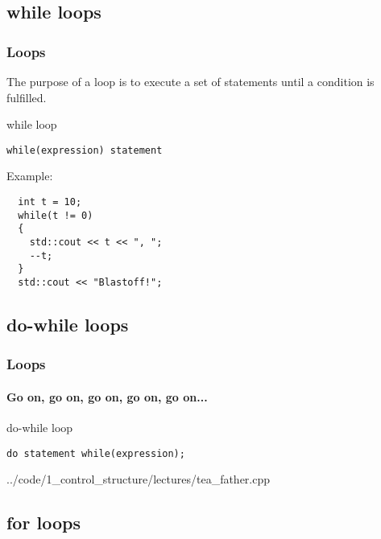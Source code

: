 \documentclass{beamer}
\begin{document}
\subsection{while loops}

\begin{frame}[fragile]
  \frametitle{Loops}
  The purpose of a loop is to execute a set of statements until a condition is fulfilled.
  \pause
  \begin{block}{while loop}
    \begin{lstlisting}
while(expression) statement
    \end{lstlisting}
    Example:
  \begin{lstlisting}
  int t = 10;
  while(t != 0)
  {
    std::cout << t << ", ";
    --t;  
  }
  std::cout << "Blastoff!";
  \end{lstlisting}
  \end{block}
\end{frame}

\subsection{do-while loops}

\begin{frame}[fragile]
  \frametitle{Loops}
  \framesubtitle{Go on, go on, go on, go on, go on...}
  
  \begin{block}{do-while loop}
    \begin{lstlisting}
do statement while(expression);
    \end{lstlisting}
    {../code/1_control_structure/lectures/tea_father.cpp}
  \end{block}
\end{frame}

\subsection{for loops}
\end{document}
